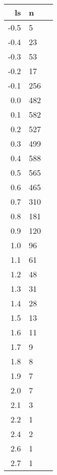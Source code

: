 \documentclass[11pt]{article}
\begin{document}
    \begin{tabular}{r|ll}
 ls & n\\
\hline
	 -0.5 &   5 \\
	 -0.4 &  23 \\
	 -0.3 &  53 \\
	 -0.2 &  17 \\
	 -0.1 & 256 \\
	  0.0 & 482 \\
	  0.1 & 582 \\
	  0.2 & 527 \\
	  0.3 & 499 \\
	  0.4 & 588 \\
	  0.5 & 565 \\
	  0.6 & 465 \\
	  0.7 & 310 \\
	  0.8 & 181 \\
	  0.9 & 120 \\
	  1.0 &  96 \\
	  1.1 &  61 \\
	  1.2 &  48 \\
	  1.3 &  31 \\
	  1.4 &  28 \\
	  1.5 &  13 \\
	  1.6 &  11 \\
	  1.7 &   9 \\
	  1.8 &   8 \\
	  1.9 &   7 \\
	  2.0 &   7 \\
	  2.1 &   3 \\
	  2.2 &   1 \\
	  2.4 &   2 \\
	  2.6 &   1 \\
	  2.7 &   1 \\
\end{tabular}


    

    
    
    
    
\end{document}
